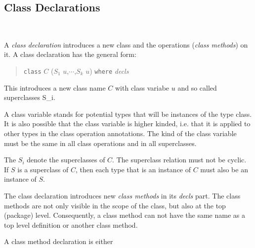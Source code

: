 \subsection{Class Declarations} \label{classdcl}  

\begin{flushleft}
     \\
  
\end{flushleft}

A \emph{class declaration} introduces a new class and the operations (\emph{class methods}) on it. A class declaration has the general form:

\begin{quote}
\texttt{class} $C$ \hspace{0.2cm} ($S_1$ $u$,$\cdots$,$S_k$ $u$) \hspace{0.2cm} \texttt{where} \hspace{0.2cm} \emph{decls}
\end{quote}

This introduces a new class name $C$ with class variabe $u$ and so called superclasses S_i.

A class variable stands for potential types that will be instances of the type class. It is also possible that the class variable is higher kinded, i.e. that it is applied to other types in the class operation annotations. The kind of the class variable must be the same in all class operations and in all superclasses.

The $S_i$ denote the superclasses of $C$.
The superclass relation must not be cyclic. If $S$ is a superclass of $C$, then each type that is an instance of $C$ must also be an instance of $S$.

The class declaration introduces new \emph{class methods} in its \emph{decls} part.
The class methods are not only visible in the scope of the class, but also at the top (package) level.
Consequently, a class method can not have the same name as a top level definition or another class method.

A class method declaration is either

